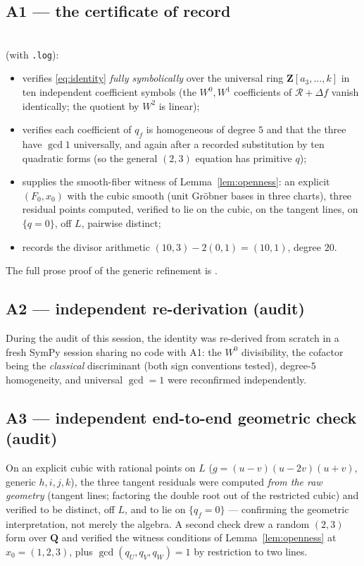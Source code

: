 \documentclass[11pt]{amsart}
\theoremstyle{definition}
\theoremstyle{remark}
\newcommand{\ZZ}{\mathbf{Z}}
\newcommand{\QQ}{\mathbf{Q}}
\newcommand{\calR}{\mathcal{R}}
\begin{document}
\subsection*{A1 --- the certificate of record}\mbox{}\par
\noindent
{}\\
 (with \texttt{.log}):
\begin{itemize}
\item verifies \eqref{eq:identity} \emph{fully symbolically} over the
universal ring $\ZZ[a_3,\dots,k]$ in ten independent coefficient symbols
(the $W^0,W^1$ coefficients of $\calR+\Delta f$ vanish identically; the
quotient by $W^2$ is linear);
\item verifies each coefficient of $q_f$ is homogeneous of degree $5$ and
that the three have $\gcd 1$ universally, and again after a recorded
substitution by ten quadratic forms (so the general $(2,3)$ equation has
primitive $q$);
\item supplies the smooth-fiber witness of Lemma~\ref{lem:openness}:
an explicit $(F_0,x_0)$ with the cubic smooth (unit Gr\"obner bases in
three charts), three residual points computed, verified to lie on the
cubic, on the tangent lines, on $\{q=0\}$, off $L$, pairwise distinct;
\item records the divisor arithmetic $(10,3)-2(0,1)=(10,1)$, degree $20$.
\end{itemize}
The full prose proof of the generic refinement is
.

\subsection*{A2 --- independent re-derivation (audit)}
During the audit of this session, the identity was re-derived from scratch
in a fresh SymPy session sharing no code with A1: the $W^0$ divisibility,
the cofactor being the \emph{classical} discriminant (both sign
conventions tested), degree-$5$ homogeneity, and universal $\gcd=1$ were
reconfirmed independently.

\subsection*{A3 --- independent end-to-end geometric check (audit)}
On an explicit cubic with rational points on $L$
($g=(u-v)(u-2v)(u+v)$, generic $h,i,j,k$), the three tangent residuals
were computed \emph{from the raw geometry} (tangent lines; factoring the
double root out of the restricted cubic) and verified to be distinct, off
$L$, and to lie on $\{q_f=0\}$ --- confirming the geometric
interpretation, not merely the algebra.  A second check drew a random
$(2,3)$ form over $\QQ$ and verified the witness conditions of
Lemma~\ref{lem:openness} at $x_0=(1,2,3)$, plus $\gcd(q_U,q_V,q_W)=1$ by
restriction to two lines.
\end{document}
